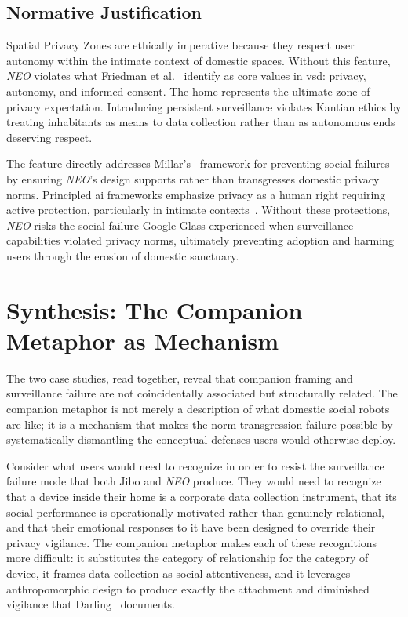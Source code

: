 \documentclass{ieee-portfolio}
\newcommand{\neo}{\textit{NEO}}
\begin{document}
\subsection{Normative Justification}

Spatial Privacy Zones are ethically imperative because they respect user autonomy within the intimate context of domestic spaces. Without this feature, \neo{} violates what Friedman et al.~\cite{friedman_value_2013} identify as core values in \gls{vsd}: privacy, autonomy, and informed consent. The home represents the ultimate zone of privacy expectation. Introducing persistent surveillance violates Kantian ethics by treating inhabitants as means to data collection rather than as autonomous ends deserving respect.

The feature directly addresses Millar's~\cite{millar_social_2020} framework for preventing social failures by ensuring \neo{}'s design supports rather than transgresses domestic privacy norms. Principled \gls{ai} frameworks emphasize privacy as a human right requiring active protection, particularly in intimate contexts~\cite{fjeld_principled_2020}. Without these protections, \neo{} risks the social failure Google Glass experienced when surveillance capabilities violated privacy norms, ultimately preventing adoption and harming users through the erosion of domestic sanctuary.

\section{Synthesis: The Companion Metaphor as Mechanism}
\label{sec:synthesis}

The two case studies, read together, reveal that companion framing and surveillance failure are not coincidentally associated but structurally related. The companion metaphor is not merely a description of what domestic social robots are like; it is a mechanism that makes the norm transgression failure possible by systematically dismantling the conceptual defenses users would otherwise deploy.

Consider what users would need to recognize in order to resist the surveillance failure mode that both Jibo and \neo{} produce. They would need to recognize that a device inside their home is a corporate data collection instrument, that its social performance is operationally motivated rather than genuinely relational, and that their emotional responses to it have been designed to override their privacy vigilance. The companion metaphor makes each of these recognitions more difficult: it substitutes the category of relationship for the category of device, it frames data collection as social attentiveness, and it leverages anthropomorphic design to produce exactly the attachment and diminished vigilance that Darling~\cite{darling_whos_2015} documents.
\end{document}
